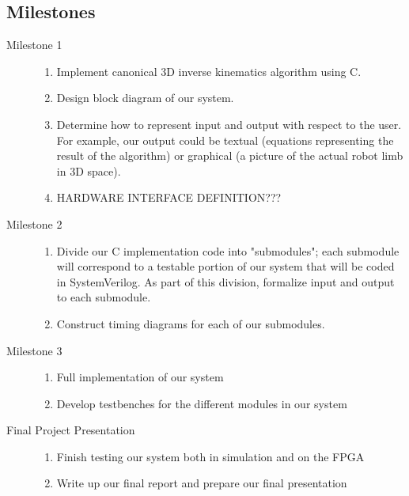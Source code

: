 \subsection*{Milestones}

\begin{description}
\item[Milestone 1]

\begin{enumerate}
\item Implement canonical 3D inverse kinematics algorithm using C.
\item Design block diagram of our system.
\item Determine how to represent input and output with respect to the user. For example,
	our output could be textual (equations representing the result of the algorithm) or
	graphical (a picture of the actual robot limb in 3D space).
\item HARDWARE INTERFACE DEFINITION???
\end{enumerate}


\item[Milestone 2]
\begin{enumerate}
\item Divide our C implementation code into "submodules"; each submodule will correspond
to a testable portion of our system that will be coded in SystemVerilog. As part of this
division, formalize input and output to each submodule.
\item Construct timing diagrams for each of our submodules.
\end{enumerate}

\item[Milestone 3]
\begin{enumerate}
\item Full implementation of our system
\item Develop testbenches for the different modules in our system
\end{enumerate}

\item[Final Project Presentation]
\begin{enumerate}
\item Finish testing our system both in simulation and on the FPGA
\item Write up our final report and prepare our final presentation
\end{enumerate}

\end{description}

%
%
%
%
%

